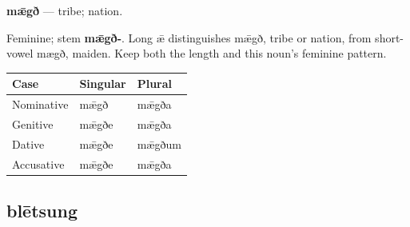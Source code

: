 \par\begin{minipage}{\linewidth}\raggedright
\textbf{mǣgð} — tribe; nation.

Feminine; stem \textbf{mǣgð-}. Long ǣ distinguishes mǣgð, tribe or nation, from short-vowel mægð, maiden. Keep both the length and this noun’s feminine pattern.

\par\begingroup
\fontsize{10.5}{13.2}\selectfont
\setlength{\LTleft}{0pt}\setlength{\LTright}{\fill}
\noindent
\begin{tabular}{@{}>{\raggedright\arraybackslash}p{39.46mm}>{\raggedright\arraybackslash}p{39.46mm}>{\raggedright\arraybackslash}p{39.46mm}@{}}
\toprule
\textbf{Case} & \textbf{Singular} & \textbf{Plural} \\
\midrule
Nominative & mǣgð & mǣgða \\
Genitive & mǣgðe & mǣgða \\
Dative & mǣgðe & mǣgðum \\
Accusative & mǣgðe & mǣgða \\
\bottomrule
\end{tabular}
\par\endgroup

\end{minipage}\par
{}
\subsection*{blētsung}

